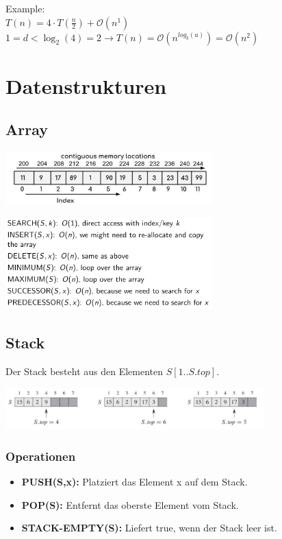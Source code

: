 \documentclass[10pt,a4paper,twocolumn]{article}
\begin{document}
Example:\\
$T(n) = 4 \cdot T(\frac{n}{2}) + \mathcal{O}(n^1)$\\
$1 = d < \log_{2}(4) = 2 \rightarrow T(n) = \mathcal{O}(n^{log_{b}(a)}) = \mathcal{O}(n^2)$ 



\section{Datenstrukturen}

\subsection{Array}

\begin{center}
	\includegraphics[width=8cm]{images/array1}
\end{center}

\begin{center}
	\includegraphics[width=8cm]{images/array_operations}
\end{center}




\subsection{Stack}
Der Stack besteht aus den Elementen $S[1..S.top]$.

\begin{center}
\includegraphics[width=10cm]{images/stack-layout}
\end{center}

\subsubsection{Operationen}
\begin{itemize}
\item \textbf{PUSH(S,x):} Platziert das Element x auf dem Stack. 
\item \textbf{POP(S):} Entfernt das oberste Element vom Stack.
\item \textbf{STACK-EMPTY(S):} Liefert true, wenn der Stack leer ist.
\end{itemize}
\end{document}

